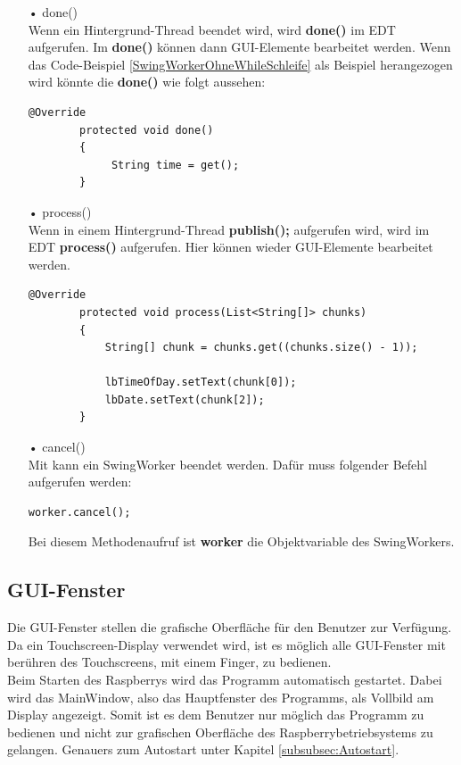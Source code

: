 \begin{itemize}
\item[•] done()
\\ Wenn ein Hintergrund-Thread beendet wird, wird \textbf{done()} im EDT aufgerufen. Im \textbf{done()} können dann GUI-Elemente bearbeitet werden. Wenn das Code-Beispiel \ref{SwingWorkerOhneWhileSchleife} als Beispiel herangezogen wird könnte die \textbf{done()} wie folgt aussehen:
\begin{lstlisting}[style=JavaStyle, caption=SwingWorker done()]
	    @Override
        protected void done()
        {
             String time = get();
        }
\end{lstlisting}
\item[•] process()
\\ Wenn in einem Hintergrund-Thread \textbf{publish();} aufgerufen wird, wird im EDT \textbf{process()} aufgerufen. Hier können wieder GUI-Elemente bearbeitet werden.
\begin{lstlisting}[style=JavaStyle, caption=SwingWorker process()]
        @Override
        protected void process(List<String[]> chunks)
        {
            String[] chunk = chunks.get((chunks.size() - 1));
            
            lbTimeOfDay.setText(chunk[0]);
            lbDate.setText(chunk[2]);
        }
\end{lstlisting}
\item[•] cancel()
\\ Mit  kann ein SwingWorker beendet werden. Dafür muss folgender Befehl aufgerufen werden:
\begin{lstlisting}[style=JavaStyle, caption=SwingWorker abbrechen]
	    worker.cancel();
\end{lstlisting}
Bei diesem Methodenaufruf ist \textbf{worker} die Objektvariable des SwingWorkers.
\end{itemize}

\subsection{GUI-Fenster}
Die GUI-Fenster stellen die grafische Oberfläche für den Benutzer zur Verfügung. Da ein Touchscreen-Display verwendet wird, ist es möglich alle GUI-Fenster mit berühren des Touchscreens, mit einem Finger, zu bedienen. 
\\ Beim Starten des Raspberrys wird das Programm automatisch gestartet. Dabei wird das MainWindow, also das Hauptfenster des Programms, als Vollbild am Display angezeigt. Somit ist es dem Benutzer nur möglich das Programm zu bedienen und nicht zur grafischen Oberfläche des Raspberrybetriebsystems zu gelangen. Genauers zum Autostart unter Kapitel \ref{subsubsec:Autostart}.

